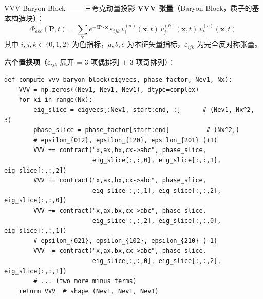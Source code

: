 \documentclass[10pt,aspectratio=169]{beamer}
\begin{document}
\begin{frame}[fragile]{VVV Baryon Block —— 三夸克动量投影}
\small
\textbf{VVV 张量}（Baryon Block，质子的基本构造块）：
\begin{equation}
  \boxed{
  \Phi_{abc}(\mathbf{P}, t) = \sum_{\mathbf{x}} e^{-i\mathbf{P}\cdot\mathbf{x}}\,
  \varepsilon_{ijk}\,
  v^{(a)}_i(\mathbf{x}, t)\,
  v^{(b)}_j(\mathbf{x}, t)\,
  v^{(c)}_k(\mathbf{x}, t)
  }
\end{equation}
其中 $i,j,k \in \{0,1,2\}$ 为色指标，$a,b,c$ 为本征矢量指标，$\varepsilon_{ijk}$ 为完全反对称张量。

\textbf{六个置换项}（$\varepsilon_{ijk}$ 展开 = 3 项偶排列 $+$ 3 项奇排列）：
\begin{lstlisting}
def compute_vvv_baryon_block(eigvecs, phase_factor, Nev1, Nx):
    VVV = np.zeros((Nev1, Nev1, Nev1), dtype=complex)
    for xi in range(Nx):
        eig_slice = eigvecs[:Nev1, start:end, :]      # (Nev1, Nx^2, 3)
        phase_slice = phase_factor[start:end]          # (Nx^2,)
        # epsilon_{012}, epsilon_{120}, epsilon_{201} (+1)
        VVV += contract("x,ax,bx,cx->abc", phase_slice,
                        eig_slice[:,:,0], eig_slice[:,:,1], eig_slice[:,:,2])
        VVV += contract("x,ax,bx,cx->abc", phase_slice,
                        eig_slice[:,:,1], eig_slice[:,:,2], eig_slice[:,:,0])
        VVV += contract("x,ax,bx,cx->abc", phase_slice,
                        eig_slice[:,:,2], eig_slice[:,:,0], eig_slice[:,:,1])
        # epsilon_{021}, epsilon_{102}, epsilon_{210} (-1)
        VVV -= contract("x,ax,bx,cx->abc", phase_slice,
                        eig_slice[:,:,0], eig_slice[:,:,2], eig_slice[:,:,1])
        # ... (two more minus terms)
    return VVV  # shape (Nev1, Nev1, Nev1)
\end{lstlisting}
\end{frame}
\end{document}
